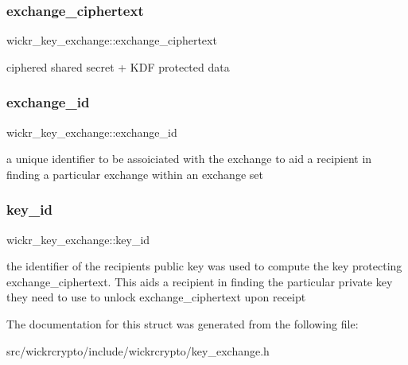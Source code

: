\subsubsection{\texorpdfstring{exchange\+\_\+ciphertext}{exchange\_ciphertext}}
{\footnotesize\ttfamily wickr\+\_\+key\+\_\+exchange\+::exchange\+\_\+ciphertext}

ciphered shared secret + K\+DF protected data \mbox{\label{structwickr__key__exchange_a744e71ef6676c78643646adf1693a4e5}} 
\subsubsection{\texorpdfstring{exchange\+\_\+id}{exchange\_id}}
{\footnotesize\ttfamily wickr\+\_\+key\+\_\+exchange\+::exchange\+\_\+id}

a unique identifier to be assoiciated with the exchange to aid a recipient in finding a particular exchange within an exchange set \mbox{\label{structwickr__key__exchange_abc0c1dbc866c150ffc275546b7e91e2d}} 
\subsubsection{\texorpdfstring{key\+\_\+id}{key\_id}}
{\footnotesize\ttfamily wickr\+\_\+key\+\_\+exchange\+::key\+\_\+id}

the identifier of the recipient\textquotesingle{}s public key was used to compute the key protecting \textquotesingle{}exchange\+\_\+ciphertext\textquotesingle{}. This aids a recipient in finding the particular private key they need to use to unlock \textquotesingle{}exchange\+\_\+ciphertext\textquotesingle{} upon receipt 

The documentation for this struct was generated from the following file\+:\begin{DoxyCompactItemize}
\item 
src/wickrcrypto/include/wickrcrypto/key\+\_\+exchange.\+h\end{DoxyCompactItemize}

